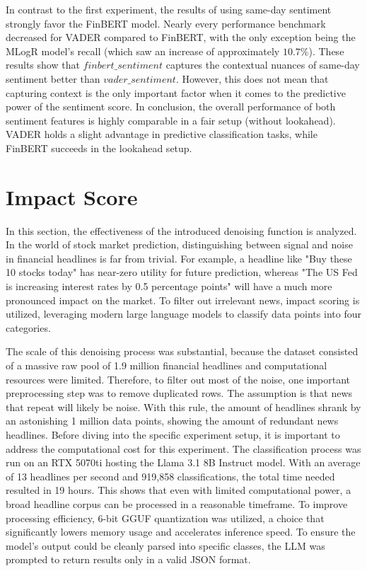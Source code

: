 \documentclass[Master,english,IEEE]{twbook}
\begin{document}
In contrast to the first experiment, the results of using same-day sentiment strongly favor the FinBERT model. Nearly every performance benchmark decreased for VADER compared to FinBERT, with the only exception being the MLogR model's recall (which saw an increase of approximately $10.7$\%). These results show that $finbert\_sentiment$ captures the contextual nuances of same-day sentiment better than $vader \_sentiment$. However, this does not mean that capturing context is the only important factor when it comes to the predictive power of the sentiment score. In conclusion, the overall performance of both sentiment features is highly comparable in a fair setup (without lookahead). VADER holds a slight advantage in predictive classification tasks, while FinBERT succeeds in the lookahead setup.

\section{Impact Score}
In this section, the effectiveness of the introduced denoising function is analyzed. In the world of stock market prediction, distinguishing between signal and noise in financial headlines is far from trivial. For example, a headline like "Buy these 10 stocks today" has near-zero utility for future prediction, whereas "The US Fed is increasing interest rates by 0.5 percentage points" will have a much more pronounced impact on the market. To filter out irrelevant news, impact scoring is utilized, leveraging modern large language models to classify data points into four categories.

The scale of this denoising process was substantial, because the dataset consisted of a massive raw pool of 1.9 million financial headlines and computational resources were limited. Therefore, to filter out most of the noise, one important preprocessing step was to remove duplicated rows. The assumption is that news that repeat will likely be noise. With this rule, the amount of headlines shrank by an astonishing 1 million data points, showing the amount of redundant news headlines.
Before diving into the specific experiment setup, it is important to address the computational cost for this experiment. The classification process was run on an RTX 5070ti hosting the Llama 3.1 8B Instruct model. With an average of 13 headlines per second and 919,858 classifications, the total time needed resulted in 19 hours. This shows that even with limited computational power, a broad headline corpus can be processed in a reasonable timeframe. To improve processing efficiency, 6-bit GGUF quantization was utilized, a choice that significantly lowers memory usage and accelerates inference speed. To ensure the model's output could be cleanly parsed into specific classes, the LLM was prompted to return results only in a valid JSON format.
\end{document}
